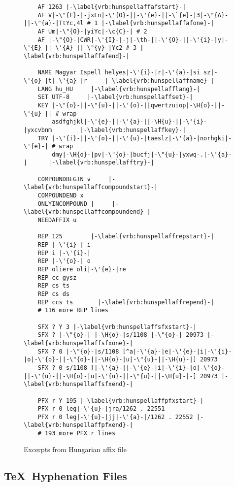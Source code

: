 \documentclass[a4paper,conference]{IEEEtran}
\begin{document}
\begin{figure}[tbp]
  \centering
  \begin{lstlisting}
    AF 1263 |-\label{vrb:hunspellaffafstart}-|
    AF V|-\"{E}-|-jxLn|-\'{O}-||-\'{e}-||-\`{e}-|3|-\"{A}-||-\"{a}-|TtYc,4l # 1 |-\label{vrb:hunspellaffafone}-|
    AF Um|-\"{O}-|yiYc|-\c{C}-| # 2
    AF |-\"{O}-|CWR|-\'{I}-|-j|-\th-||-\'{O}-||-\'{i}-|y|-\'{E}-||-\'{A}-||-\"{y}-|Yc2 # 3 |-\label{vrb:hunspellaffafend}-|

    NAME Magyar Ispell helyes|-\'{i}-|r|-\'{a}-|si sz|-\'{o}-|t|-\'{a}-|r     |-\label{vrb:hunspellaffname}-|
    LANG hu_HU     |-\label{vrb:hunspellafflang}-|
    SET UTF-8     |-\label{vrb:hunspellaffset}-|
    KEY |-\"{o}-||-\"{u}-||-\'{o}-||qwertzuiop|-\H{o}-||-\'{u}-|| # wrap
        asdfghjkl|-\'{e}-||-\'{a}-||-\H{u}-||-\'{i}-|yxcvbnm        |-\label{vrb:hunspellaffkey}-|
    TRY |-\'{i}-||-\'{o}-||-\'{u}-|taeslz|-\'{a}-|norhgki|-\'{e}-| # wrap
        dmy|-\H{o}-|pv|-\"{o}-|bucfj|-\"{u}-|yxwq-.|-\'{a}-|      |-\label{vrb:hunspellafftry}-|
    
    COMPOUNDBEGIN v     |-\label{vrb:hunspellaffcompoundstart}-|
    COMPOUNDEND x     
    ONLYINCOMPOUND |     |-\label{vrb:hunspellaffcompoundend}-|
    NEEDAFFIX u     
    
    REP 125        |-\label{vrb:hunspellaffrepstart}-|
    REP |-\'{i}-| i       
    REP i |-\'{i}-|       
    REP |-\'{o}-| o       
    REP oliere oli|-\'{e}-|re
    REP cc gysz       
    REP cs ts       
    REP cs ds       
    REP ccs ts       |-\label{vrb:hunspellaffrepend}-|
    # 116 more REP lines
    
    SFX ? Y 3 |-\label{vrb:hunspellaffsfxstart}-|
    SFX ? |-\"{o}-| |-\H{o}-|s/1108 |-\"{o}-| 20973 |-\label{vrb:hunspellaffsfxone}-|
    SFX ? 0 |-\"{o}-|s/1108 [^a|-\'{a}-|e|-\'{e}-|i|-\'{i}-|o|-\'{o}-||-\"{o}-||-\H{o}-|u|-\"{u}-||-\H{u}-|] 20973
    SFX ? 0 s/1108 [|-\'{a}-||-\'{e}-|i|-\'{i}-|o|-\'{o}-||-\'{u}-||-\H{o}-|u|-\'{u}-||-\"{u}-||-\H{u}-|-] 20973 |-\label{vrb:hunspellaffsfxend}-|
    
    PFX r Y 195 |-\label{vrb:hunspellaffpfxstart}-|
    PFX r 0 leg|-\'{u}-|jra/1262 . 22551
    PFX r 0 leg|-\'{u}-|jj|-\'{a}-|/1262 . 22552 |-\label{vrb:hunspellaffpfxend}-|
    # 193 more PFX r lines
  \end{lstlisting}
  \caption{Excerpts from Hungarian affix file}
  \label{fig:hunspell-aff-examples}
\end{figure}

\subsection{\TeX\ Hyphenation Files}
\label{subsec:material-tex}
\end{document}
